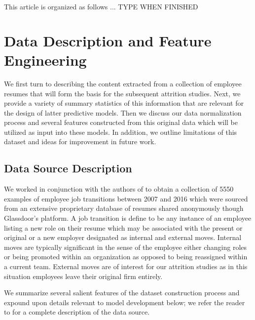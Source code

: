 \documentclass[10pt]{article}
\begin{document}
This article is organized as follows ... TYPE WHEN FINISHED 

\section{Data Description and Feature Engineering}

We first turn to describing the content extracted from a collection of 
employee resumes that will form the basis for the subsequent attrition studies. 
Next, we provide a variety of summary statistics of this information that 
are relevant for the design of latter predictive models.  Then we discuss 
our data normalization process and 
several features constructed from this original data which will be utilized 
as input into these models.
In addition, we outline limitations of this dataset and ideas for improvement  
in future work.

\subsection{Data Source Description}

We worked in conjunction with the authors of \cite{Smart2016} to obtain 
a collection of 5550 examples of employee job transitions between 
2007 and 2016 which were sourced from an extensive proprietary database of 
resumes shared anonymously though Glassdoor's platform.  A job transition 
is define to be any instance of an employee listing a new role on their 
resume which may be associated with the present or original or a new employer
designated as internal and external moves.  Internal moves are typically 
significant in the sense of the employee either changing roles or 
being promoted within an organization as opposed to being reassigned 
within a current team. External moves are of interest for our 
attrition studies as in this situation employees leave their original 
firm entirely.

We summarize several salient features of the dataset construction process 
and expound upon details relevant to model development below; we refer the
reader to \cite{Smart2016} for a complete description of the data source. 
\end{document}
